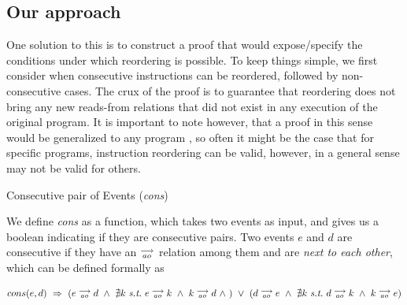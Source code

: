     \subsection{Our approach}
    One solution to this is to construct a proof that would expose/specify the conditions under which reordering is possible. To keep things simple, we first consider when consecutive instructions can be reordered, followed by non-consecutive cases. The crux of the proof is to guarantee that reordering does not bring any new reads-from relations that did not exist in any execution of the original program. It is important to note however, that a proof in this sense would be generalized to any program , so often it might be the case that for specific programs, instruction reordering can be valid, however, in a general sense may not be valid for others. 
    

    
    \begin{definition}{Consecutive pair of Events (\emph{cons})}
        
        We define \emph{cons} as a function, which takes two events as input, and gives us a boolean indicating if they are consecutive pairs. Two events $e$ and $d$ are consecutive if they have an $\stackrel{\longrightarrow}{_{ao}}$ relation among them and are \emph{next to each other}, which can be defined formally as 
        
        \[
            cons(e,d) \ \Rightarrow \ 
            (
                e \stck{_{ao}} d  \ \wedge \ 
                \nexists k \ \textit{s.t.} \ 
                e \stck{_{ao}} k  \ \wedge \
                k \stck{_{ao}} d  \ \wedge \
            )
            \ \vee \
            (
                d \stck{_{ao}} e  \ \wedge \ 
                \nexists k \ \textit{s.t.} \ 
                d \stck{_{ao}} k  \ \wedge \
                k \stck{_{ao}} e  
            )
        \]
        
        
    \end{definition}

